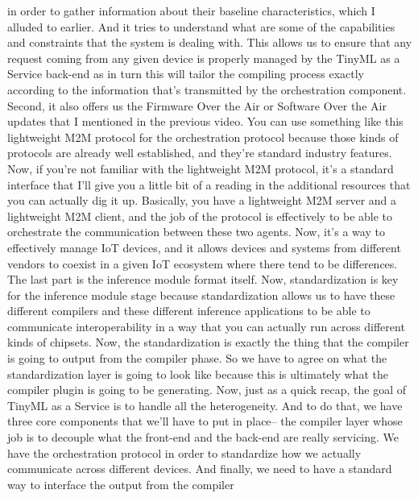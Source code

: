 {{{{{    in order to gather information about their baseline characteristics, which
    I alluded to earlier.
    And it tries to understand what are some of the capabilities and constraints
    that the system is dealing with.
    This allows us to ensure that any request coming from any given device
    is properly managed by the TinyML as a Service back-end
    as in turn this will tailor the compiling process exactly
    according to the information that's transmitted by the orchestration
    component.
    Second, it also offers us the Firmware Over the Air or Software
    Over the Air updates that I mentioned in the previous video.
    You can use something like this lightweight M2M
    protocol for the orchestration protocol because those kinds of protocols
    are already well established, and they're standard industry features.
    Now, if you're not familiar with the lightweight M2M protocol,
    it's a standard interface that I'll give you
    a little bit of a reading in the additional resources
    that you can actually dig it up.
    Basically, you have a lightweight M2M server and a lightweight M2M client,
    and the job of the protocol is effectively
    to be able to orchestrate the communication between these two agents.
    Now, it's a way to effectively manage IoT devices,
    and it allows devices and systems from different vendors
    to coexist in a given IoT ecosystem where there tend to be differences.
    The last part is the inference module format itself.
    Now, standardization is key for the inference module stage
    because standardization allows us to have
    these different compilers and these different inference applications
    to be able to communicate interoperability in a way
    that you can actually run across different kinds of chipsets.
    Now, the standardization is exactly the thing
    that the compiler is going to output from the compiler phase.
    So we have to agree on what the standardization layer is
    going to look like because this is ultimately what the compiler plugin is
    going to be generating.
    Now, just as a quick recap, the goal of TinyML as a Service
    is to handle all the heterogeneity.
    And to do that, we have three core components
    that we'll have to put in place--
    the compiler layer whose job is to decouple
    what the front-end and the back-end are really servicing.
    We have the orchestration protocol in order
    to standardize how we actually communicate across different devices.
    And finally, we need to have a standard way
    to interface the output from the compiler
}}}}}
